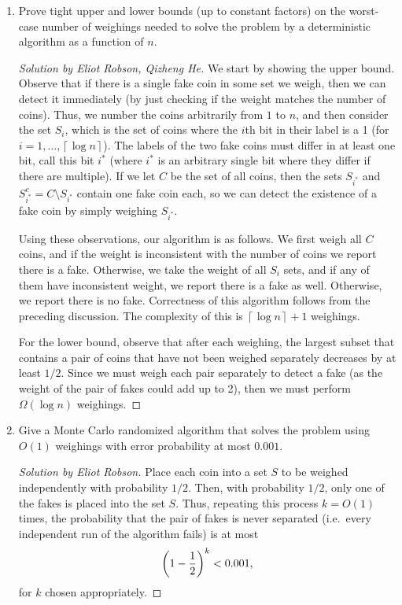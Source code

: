 \documentclass{article}
\newenvironment{solution}[1]{\begin{proof}[Solution by #1]}{\end{proof}}
\newcommand{\ceil}[1]{\left\lceil#1\right\rceil} %
\begin{document}
\begin{enumerate}
	\item Prove tight upper and lower bounds (up to constant factors) on the worst-case number of weighings needed to solve the problem by a deterministic algorithm as a function of \(n\). %
	
	\begin{solution}{Eliot Robson, Qizheng He}
		We start by showing the upper bound. Observe that if there is a single fake coin in some set we weigh, then we can detect it immediately (by just checking if the weight matches the number of coins). Thus, we number the coins arbitrarily from \(1\) to \(n\), and then consider the set \(S_i\), which is the set of coins where the \(i\)th bit in their label is a 1 (for \(i = 1, \dots, \ceil{\log n}\)). The labels of the two fake coins must differ in at least one bit, call this bit \(i^*\) (where \(i^*\) is an arbitrary single bit where they differ if there are multiple). If we let \(C\) be the set of all coins, then the sets \(S_{i^*}\) and \(S_{i^*}^c = C \setminus S_{i^*}\) contain one fake coin each, so we can detect the existence of a fake coin by simply weighing \(S_{i^*}\).
		
		Using these observations, our algorithm is as follows. We first weigh all \(C\) coins, and if the weight is inconsistent with the number of coins we report there is a fake. Otherwise, we take the weight of all \(S_i\) sets, and if any of them have inconsistent weight, we report there is a fake as well. Otherwise, we report there is no fake. Correctness of this algorithm follows from the preceding discussion. The complexity of this is \(\ceil{\log n} + 1\) weighings.
		
		For the lower bound, observe that after each weighing, the largest subset that contains a pair of coins that have not been weighed separately decreases by at least \(1/2\). Since we must weigh each pair separately to detect a fake (as the weight of the pair of fakes could add up to 2), then we must perform \(\Omega(\log n)\) weighings.
	\end{solution}
	
	\item Give a Monte Carlo randomized algorithm that solves the problem using \(O(1)\) weighings with error probability at most \(0.001\).
	
	\begin{solution}{Eliot Robson}
		Place each coin into a set \(S\) to be weighed independently with probability \(1/2\). Then, with probability \(1/2\), only one of the fakes is placed into the set \(S\). Thus, repeating this process \(k = O(1)\) times, the probability that the pair of fakes is never separated (i.e.\ every independent run of the algorithm fails) is at most
		\[
			\del{1 - \frac{1}{2}}^k < 0.001,
		\]
		for \(k\) chosen appropriately.
	\end{solution}
\end{enumerate}
\end{document}
